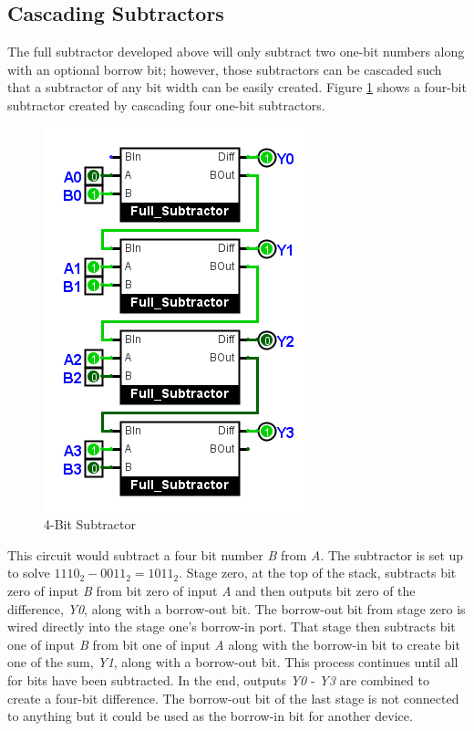 \subsection{Cascading Subtractors}
\label{CL:subsec:cascading_subtractors}

The full subtractor developed above will only subtract two one-bit numbers along with an optional borrow bit; however, those subtractors can be cascaded such that a subtractor of any bit width can be easily created. Figure \ref{fig:08_10} shows a four-bit subtractor created by cascading four one-bit subtractors.

\begin{figure}[H]
	\centering
	\includegraphics[width=\maxwidth{.95\linewidth}]{gfx/08_10}
	\caption{4-Bit Subtractor}
	\label{fig:08_10}
\end{figure}

This circuit would subtract a four bit number \emph{B} from \emph{A}. The subtractor is set up to solve $ 1110_2 - 0011_2 = 1011_2 $. Stage zero, at the top of the stack, subtracts bit zero of input \emph{B} from bit zero of input \emph{A} and then outputs bit zero of the difference, \emph{Y0}, along with a borrow-out bit. The borrow-out bit from stage zero is wired directly into the stage one's borrow-in port. That stage then subtracts bit one of input \emph{B} from bit one of input \emph{A} along with the borrow-in bit to create bit one of the sum, \emph{Y1}, along with a borrow-out bit. This process continues until all for bits have been subtracted. In the end, outputs \emph{Y0} - \emph{Y3} are combined to create a four-bit difference. The borrow-out bit of the last stage is not connected to anything but it could be used as the borrow-in bit for another device.

